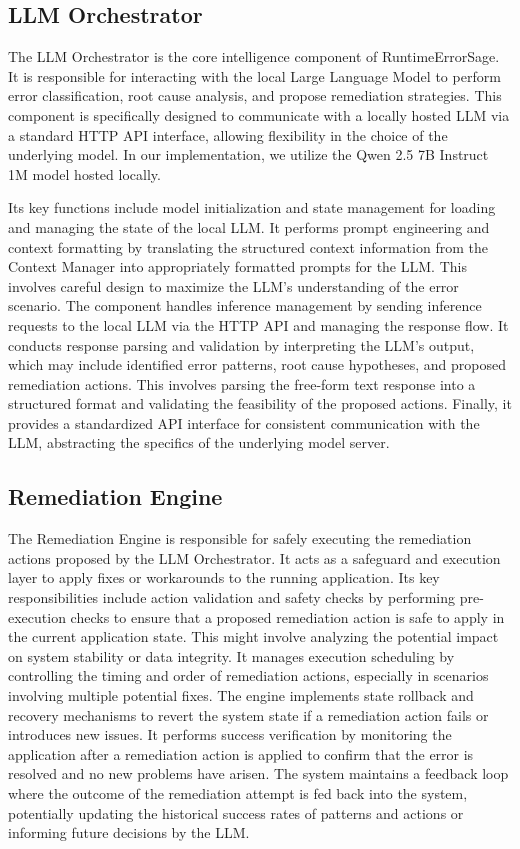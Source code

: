 \subsection{LLM Orchestrator}
The LLM Orchestrator is the core intelligence component of RuntimeErrorSage. It is responsible for interacting with the local Large Language Model to perform error classification, root cause analysis, and propose remediation strategies. This component is specifically designed to communicate with a locally hosted LLM via a standard HTTP API interface, allowing flexibility in the choice of the underlying model. In our implementation, we utilize the Qwen 2.5 7B Instruct 1M model hosted locally.

Its key functions include model initialization and state management for loading and managing the state of the local LLM. It performs prompt engineering and context formatting by translating the structured context information from the Context Manager into appropriately formatted prompts for the LLM. This involves careful design to maximize the LLM's understanding of the error scenario. The component handles inference management by sending inference requests to the local LLM via the HTTP API and managing the response flow. It conducts response parsing and validation by interpreting the LLM's output, which may include identified error patterns, root cause hypotheses, and proposed remediation actions. This involves parsing the free-form text response into a structured format and validating the feasibility of the proposed actions. Finally, it provides a standardized API interface for consistent communication with the LLM, abstracting the specifics of the underlying model server.

\subsection{Remediation Engine}
The Remediation Engine is responsible for safely executing the remediation actions proposed by the LLM Orchestrator. It acts as a safeguard and execution layer to apply fixes or workarounds to the running application. Its key responsibilities include action validation and safety checks by performing pre-execution checks to ensure that a proposed remediation action is safe to apply in the current application state. This might involve analyzing the potential impact on system stability or data integrity. It manages execution scheduling by controlling the timing and order of remediation actions, especially in scenarios involving multiple potential fixes. The engine implements state rollback and recovery mechanisms to revert the system state if a remediation action fails or introduces new issues. It performs success verification by monitoring the application after a remediation action is applied to confirm that the error is resolved and no new problems have arisen. The system maintains a feedback loop where the outcome of the remediation attempt is fed back into the system, potentially updating the historical success rates of patterns and actions or informing future decisions by the LLM.

